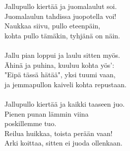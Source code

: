 
Jallupullo kiertää ja juomalaulut soi. \\ Juomalaulun tahdissa juopotella voi! \\ Naukkaa siivu, pullo eteenpäin, \\ kohta pullo tämäkin, tyhjänä on näin. \\ \hspace{10mm} \\ Jallu pian loppui ja laulu sitten myös. \\ Ähinä ja puhina, kuuluu kohta yös': \\ "Eipä tässä hätää", yksi tuumi vaan, \\ ja jemmapullon kaiveli kohta repustaan. \\ \hspace{10mm} \\ Jallupullo kiertää ja kaikki taaseen juo. \\ Pienen punan lämmin viina \\ poskillemme tuo. \\ Reilua huikkaa, toista perään vaan! \\ Arki koittaa, sitten ei juoda ollenkaan.